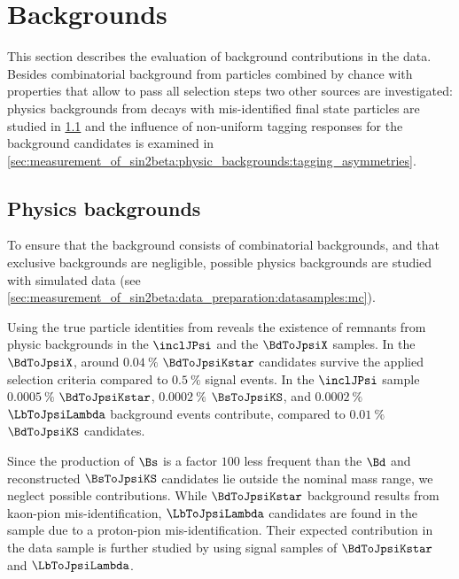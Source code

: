 
\section{Backgrounds}
\label{sec:measurement_of_sin2beta:physic_backgrounds}

This section describes the evaluation of background contributions in the data.
Besides combinatorial background from particles combined by chance with
properties that allow to pass all selection steps two other sources are
investigated: physics backgrounds from decays with mis-identified final state
particles are studied in
\cref{sec:measurement_of_sin2beta:physic_backgrounds:physic_backgrounds} and the
influence of non-uniform tagging responses for the background candidates is
examined in
\cref{sec:measurement_of_sin2beta:physic_backgrounds:tagging_asymmetries}.

\subsection{Physics backgrounds}
\label{sec:measurement_of_sin2beta:physic_backgrounds:physic_backgrounds}

To ensure that the background consists of combinatorial backgrounds, and that
exclusive backgrounds are negligible, possible physics backgrounds are studied
with simulated data (see \cref{sec:measurement_of_sin2beta:data_preparation:datasamples:mc}). 

Using the true particle identities from \MC reveals the existence of remnants
from physic backgrounds in the $\inclJPsi$ and the $\BdToJpsiX$ \MC samples. In
the $\BdToJpsiX$, around $\SI{0.04}{\percent}$ $\BdToJpsiKstar$ candidates
survive the applied selection criteria compared to $\SI{0.5}{\percent}$ signal
events. In the $\inclJPsi$ sample $\SI{0.0005}{\percent}$ $\BdToJpsiKstar$,
$\SI{0.0002}{\percent}$ $\BsToJpsiKS$, and $\SI{0.0002}{\percent}$
$\LbToJpsiLambda$ background events contribute, compared to
$\SI{0.01}{\percent}$ $\BdToJpsiKS$ candidates.

Since the production of $\Bs$ is a factor $\num{100}$ less frequent than the
$\Bd$ and reconstructed $\BsToJpsiKS$ candidates lie outside the nominal mass
range, we neglect possible contributions. While $\BdToJpsiKstar$ background
results from kaon-pion mis-identification, $\LbToJpsiLambda$ candidates are
found in the sample due to a proton-pion mis-identification. Their expected
contribution in the data sample is further studied by using signal \MC samples
of $\BdToJpsiKstar$ and $\LbToJpsiLambda$.

